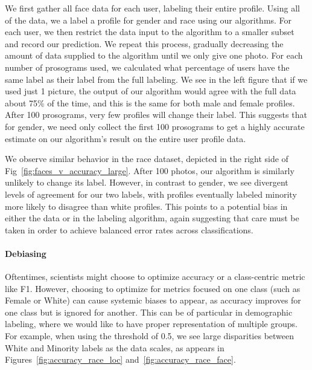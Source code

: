 We first gather all face data for each user, labeling their entire profile.
Using all of the data, we a label a profile for gender and race using our algorithms.
For each user, we then restrict the data input to the algorithm to a smaller subset and record our prediction.
We repeat this process, gradually decreasing the amount of data supplied to the algorithm until we only give one photo.
For each number of prosograms used, we calculated what percentage of users have the same label as their label from the full labeling.
We see in the left figure that if we used just 1 picture, the output of our algorithm would agree with the full data about 75\% of the time, and this is the same for both male and female profiles.
After 100 prosograms, very few profiles will change their label.
This suggests that for gender, we need only collect the first 100 prosograms to get a highly accurate estimate on our algorithm's result on the entire user profile data.

We observe similar behavior in the race dataset, depicted in the right side of Fig~\ref{fig:faces_v_accuracy_large}.
After 100 photos, our algorithm is similarly unlikely to change its label.
However, in contrast to gender, we see divergent levels of agreement for our two labels, with profiles eventually labeled minority more likely to disagree than white profiles.
This points to a potential bias in either the data or in the labeling algorithm, again suggesting that care must be taken in order to achieve balanced error rates across classifications.

\paragraph{Debiasing}
Oftentimes, scientists might choose to optimize accuracy or a class-centric metric like F1.
However, choosing to optimize for metrics focused on one class (such as Female or White) can cause systemic biases to appear, as accuracy improves for one class but is ignored for another.
This can be of particular in demographic labeling, where we would like to have proper representation of multiple groups.
For example, when using the threshold of 0.5, we see large disparities between White and Minority labels as the data scales, as appears in Figures~\ref{fig:accuracy_race_loc} and~\ref{fig:accuracy_race_face}.

